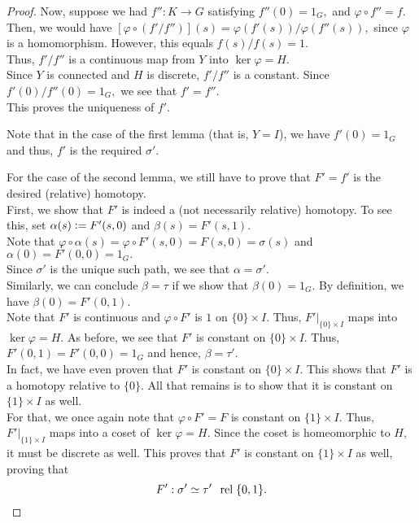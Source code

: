 \documentclass[12pt]{article}
\newcommand{\rel}{\;\;\operatorname{rel}\;}
\begin{document}
\begin{proof}
 	Now, suppose we had $f'': K \to G$ satisfying $f''(0) = 1_G,$ and $\varphi\circ f'' = f.$\\
 	Then, we would have $[\varphi\circ(f'/f'')](s) = \varphi(f'(s))/\varphi(f''(s)),$ since $\varphi$ is a homomorphism. However, this equals $f(s)/f(s) = 1.$\\
 	Thus, $f'/f''$ is a continuous map from $Y$ into $\ker\varphi = H.$\\
 	Since $Y$ is connected and $H$ is discrete, $f'/f''$ is a constant. Since $f'(0)/f''(0) = 1_G,$ we see that $f' = f''.$\\
 	This proves the uniqueness of $f'.$

 	Note that in the case of the first lemma (that is, $Y = I$), we have $f'(0) = 1_G$ and thus, $f'$ is the required $\sigma'.$

 	For the case of the second lemma, we still have to prove that $F' = f'$ is the desired (relative) homotopy.\\
 	First, we show that $F'$ is indeed a (not necessarily relative) homotopy. To see this, set $\alpha(s) \vcentcolon= F'(s, 0)$ and $\beta(s) = F'(s, 1).$\\
 	Note that $\varphi\circ \alpha(s) = \varphi \circ F'(s, 0) = F(s, 0) = \sigma(s)$ and $\alpha(0) = F'(0, 0) = 1_G.$ \\
 	Since $\sigma'$ is the unique such path, we see that $\alpha = \sigma'.$\\
 	Similarly, we can conclude $\beta = \tau$ if we show that $\beta(0) = 1_G.$ By definition, we have $\beta(0) = F'(0, 1).$ \\
 	Note that $F'$ is continuous and $\varphi \circ F'$ is $1$ on $\{0\} \times I.$ Thus, $F'|_{\{0\} \times I}$ maps into $\ker \varphi = H.$ As before, we see that $F'$ is constant on $\{0\} \times I.$ Thus, $F'(0, 1) = F'(0, 0) = 1_G$ and hence, $\beta = \tau'.$\\
 	In fact, we have even proven that $F'$ is constant on $\{0\} \times I.$ This shows that $F'$ is a homotopy relative to $\{0\}.$ All that remains is to show that it is constant on $\{1\} \times I$ as well.\\
 	For that, we once again note that $\varphi\circ F' = F$ is constant on $\{1\}\times I.$ Thus, $F'|_{\{1\}\times I}$ maps into a coset of $\ker \varphi = H.$ Since the coset is homeomorphic to $H,$ it must be discrete as well. This proves that $F'$ is constant on $\{1\} \times I$ as well, proving that
 	\begin{equation*} 
 		F' : \sigma' \simeq \tau' \rel \{0, 1\}. \qedhere
 	\end{equation*}
 \end{proof} 
\end{document}
